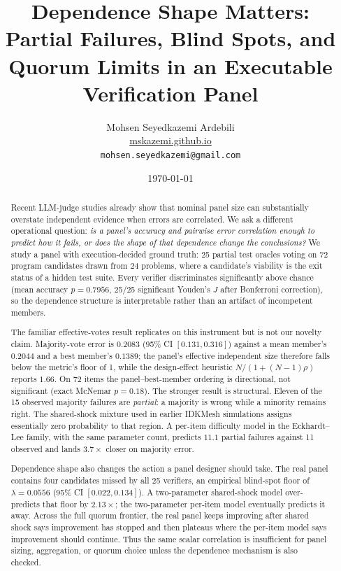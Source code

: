 \documentclass[11pt,a4paper]{article}
\title{\bfseries Dependence Shape Matters:\\
Partial Failures, Blind Spots, and Quorum Limits in an Executable Verification Panel}
\author{Mohsen Seyedkazemi Ardebili\\
  \small\href{https://mskazemi.github.io}{mskazemi.github.io}\\
  \small\texttt{mohsen.seyedkazemi@gmail.com}}
\date{\today}
\begin{document}
\maketitle

\begin{abstract}
\noindent
Recent LLM-judge studies already show that nominal panel size can substantially
overstate independent evidence when errors are correlated. We ask a different
operational question: \emph{is a panel's accuracy and pairwise error correlation
enough to predict how it fails, or does the shape of that dependence change the
conclusions?} We study a panel with execution-decided ground truth: 25 partial
test oracles voting on 72 program candidates drawn from 24 problems, where a
candidate's viability is the exit status of a hidden test suite. Every verifier
discriminates significantly above chance (mean accuracy $p = 0.7956$, 25/25
significant Youden's $J$ after Bonferroni correction), so the dependence
structure is interpretable rather than an artifact of incompetent members.

The familiar effective-votes result replicates on this instrument but is not our
novelty claim. Majority-vote error is $0.2083$ (95\% CI $[0.131, 0.316]$)
against a mean member's $0.2044$ and a best member's $0.1389$; the panel's
effective independent size therefore falls below the metric's floor of 1, while
the design-effect heuristic $N/(1+(N-1)\rho)$ reports $1.66$. On 72 items the
panel--best-member ordering is directional, not significant (exact McNemar
$p = 0.18$). The stronger result is structural. Eleven of the 15 observed
majority failures are \emph{partial}: a majority is wrong while a minority
remains right. The shared-shock mixture used in earlier IDKMesh simulations
assigns essentially zero probability to that region. A per-item difficulty model
in the Eckhardt--Lee family, with the same parameter count, predicts $11.1$
partial failures against 11 observed and lands $3.7\times$ closer on majority
error.

Dependence shape also changes the action a panel designer should take. The real
panel contains four candidates missed by all 25 verifiers, an empirical
blind-spot floor of $\lambda = 0.0556$ (95\% CI $[0.022, 0.134]$). A
two-parameter shared-shock model over-predicts that floor by $2.13\times$; the
two-parameter per-item model eventually predicts it away. Across the full quorum
frontier, the real panel keeps improving after shared shock says improvement has
stopped and then plateaus where the per-item model says improvement should
continue. Thus the same scalar correlation is insufficient for panel sizing,
aggregation, or quorum choice unless the dependence mechanism is also checked.


\end{abstract}
\end{document}
